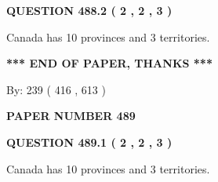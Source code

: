 \documentclass[12pt]{article}
\begin{document}
  
  
\vspace{0.2in}
  
{\textbf{\Large{QUESTION
488.2 
 ( 2 , 2 , 3 )
}}}
  
  
 
 
\noindent{}
 
 
Canada has 10  provinces and 3 territories.
 
 
 
 
   
   
 \vspace{0.2in}
 
   
   
   
   
\vspace{1.0in} 
{\textbf{\large{ *** END OF PAPER, THANKS *** }}} 
   
   
\hspace{1.0in} By: 
 239 ( 416 ,  613 )
   
   
   
   
\newpage 
\setcounter{page}{ 
   489001 } 
   
   
   
   
 {\textbf{ \Large{ PAPER NUMBER  489  }}}
   
   
\vspace{0.2in}
   
   
   
   
   
   
 \vspace{0.2in}
 
 
 
 
   
   
  
\vspace{0.2in}
  
{\textbf{\Large{QUESTION
489.1 
 ( 2 , 2 , 3 )
}}}
  
  
 
 
\noindent{}
 
 
Canada has 10  provinces and 3 territories.
 
 
 
 
  
\vspace{0.2in}
  
\end{document}

